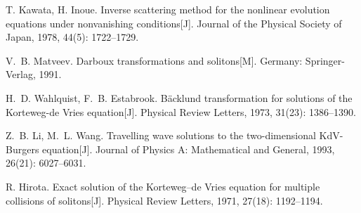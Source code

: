 \begin{thebibliography}{100}
\providecommand{\bibauthor}[1]{#1}
\providecommand{\bibeditor}[1]{#1}
\providecommand{\bibtranslator}[1]{#1}
\providecommand{\bibtitle}[1]{#1}
\providecommand{\bibbooktitle}[1]{#1}
\providecommand{\bibjournal}[1]{#1}
\providecommand{\bibmark}[1]{#1}
\providecommand{\bibcountry}[1]{#1}
\providecommand{\bibpatentid}[1]{#1}
\providecommand{\bibedition}[1]{#1}
\providecommand{\biborganization}[1]{#1}
\providecommand{\bibaddress}[1]{#1}
\providecommand{\bibpublisher}[1]{#1}
\providecommand{\bibinstitution}[1]{#1}
\providecommand{\bibschool}[1]{#1}
\providecommand{\bibvolume}[1]{#1}
\providecommand{\bibnumber}[1]{#1}
\providecommand{\bibversion}[1]{#1}
\providecommand{\bibpages}[1]{#1}
\providecommand{\bibmodifydate}[1]{#1}
\providecommand{\bibcitedate}[1]{#1}
\providecommand{\bibyear}[1]{#1}
\providecommand{\bibdate}[1]{#1}
\providecommand{\biburl}[1]{\newline\url{#1}}

\bibauthor{T. Kawata\@, H. Inoue}\@. \bibtitle{Inverse scattering method for
  the nonlinear evolution equations under nonvanishing
  conditions}\bibmark{[J]}\@. \bibjournal{Journal of the Physical Society of
  Japan}\@, \bibyear{1978}\@,
  \bibvolume{44}\bibnumber{(5)}\thinspace{}\textnormal{:
  }\bibpages{1722\thinspace{}\textnormal{--}\thinspace{}1729}\@.

\bibauthor{V.~B. Matveev}\@. \bibbooktitle{Darboux transformations and
  solitons}\bibmark{[M]}\@. \bibaddress{Germany}\thinspace{}\textnormal{:
  }\bibpublisher{Springer-Verlag}\@, \bibyear{1991}\@.

\bibauthor{H.~D. Wahlquist\@, F.~B. Estabrook}\@. \bibtitle{B{\"a}cklund
  transformation for solutions of the Korteweg-de Vries
  equation}\bibmark{[J]}\@. \bibjournal{Physical Review Letters}\@,
  \bibyear{1973}\@, \bibvolume{31}\bibnumber{(23)}\thinspace{}\textnormal{:
  }\bibpages{1386\thinspace{}\textnormal{--}\thinspace{}1390}\@.

\bibauthor{Z.~B. Li\@, M.~L. Wang}\@. \bibtitle{Travelling wave solutions to
  the two-dimensional KdV-Burgers equation}\bibmark{[J]}\@. \bibjournal{Journal
  of Physics A: Mathematical and General}\@, \bibyear{1993}\@,
  \bibvolume{26}\bibnumber{(21)}\thinspace{}\textnormal{:
  }\bibpages{6027\thinspace{}\textnormal{--}\thinspace{}6031}\@.

\bibauthor{R. Hirota}\@. \bibtitle{Exact solution of the Korteweg--de Vries
  equation for multiple collisions of solitons}\bibmark{[J]}\@.
  \bibjournal{Physical Review Letters}\@, \bibyear{1971}\@,
  \bibvolume{27}\bibnumber{(18)}\thinspace{}\textnormal{:
  }\bibpages{1192\thinspace{}\textnormal{--}\thinspace{}1194}\@.


\end{thebibliography}

